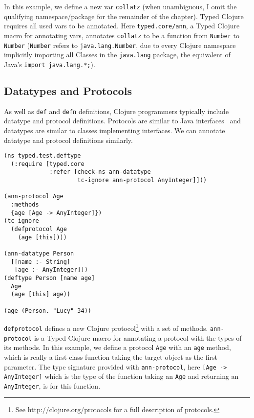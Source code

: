 In this example, we define a new var \lstinline|collatz|
(when unambiguous, I omit the qualifying namespace/package for the remainder of the chapter).
Typed Clojure requires all 
used vars to be annotated. Here \lstinline|typed.core/ann|, a Typed Clojure macro for annotating vars, 
annotates \lstinline|collatz| to be a function from \lstinline|Number| to 
\lstinline|Number| (\lstinline|Number| refers to \lstinline|java.lang.Number|,
due to every Clojure namespace implicitly importing all Classes in the \lstinline|java.lang| package,
the equivalent of Java's \lstinline|import java.lang.*;|).

\subsection{Datatypes and Protocols}
\label{sec:datatypes}

As well as \lstinline|def| and \lstinline|defn| definitions,
Clojure programmers typically include datatype and protocol
definitions. 
Protocols are similar to Java interfaces~\cite{InterfaceTutorial} and datatypes are similar to classes implementing interfaces.
We can annotate datatype and protocol definitions similarly.

\begin{lstlisting}[caption=Annotating protocols and datatypes in Typed Clojure]
(ns typed.test.deftype
  (:require [typed.core 
             :refer [check-ns ann-datatype
                     tc-ignore ann-protocol AnyInteger]]))

(ann-protocol Age 
  :methods
  {age [Age -> AnyInteger]})
(tc-ignore
  (defprotocol Age
    (age [this])))

(ann-datatype Person 
  [[name :- String]
   [age :- AnyInteger]])
(deftype Person [name age]
  Age
  (age [this] age))

(age (Person. "Lucy" 34))
\end{lstlisting}

\lstinline|defprotocol| defines a new Clojure protocol\footnote{See http://clojure.org/protocols for a full description of protocols.}
with a set of methods. \lstinline|ann-protocol| is a Typed Clojure macro for annotating 
a protocol with the types of its methods.
In this example, we define a protocol \lstinline|Age| with an \lstinline|age| method,
which is really a first-class function taking the target object as the first parameter. The
type signature provided with \lstinline|ann-protocol|, here \lstinline|[Age -> AnyInteger]|
which is the type of the function taking an \lstinline|Age| and returning an \lstinline|AnyInteger|,
is for this function.

